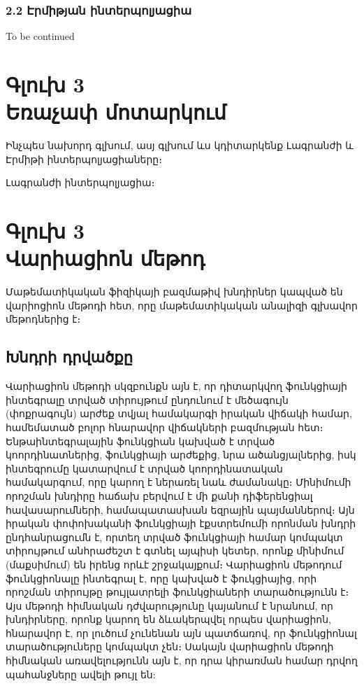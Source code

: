 \documentclass[fleqn, bachelor,subf,12pt,notitlepage]{article}
\begin{document}
\subsubsection*{2.2 Էրմիթյան ինտերպոլյացիա}
To be continued
\newpage


\section*{\centering Գլուխ 3 \\ Եռաչափ մոտարկում}
\setcounter{equation}{0}

Ինչպես նախորդ գլխում, ասյ գլխում ևս կդիտարկենք Լագրանժի և Էրմիթի ինտերպոլյացիաները։


Լագրանժի ինտերպոլյացիա։




\section*{\centering Գլուխ 3 \\ Վարիացիոն մեթոդ}
\setcounter{equation}{0}

Մաթեմատիկական ֆիզիկայի բազմաթիվ խնդիրներ կապված են վարիոցիոն մեթոդի հետ, որը մաթեմատիկական անալիզի գլխավոր մեթոդներից է։

\subsection*{Խնդրի դրվածքը}
\hspace{\parindent}Վարիացիոն մեթոդի սկզբունքն այն է, որ դիտարկվող ֆունկցիայի ինտեգրալը տրված տիրույթում ընդունում է մեծագույն (փոքրագույն) արժեք տվյալ համակարգի իրական վիճակի համար, համեմատած բոլոր հնարավոր վիճակների բազմության հետ։  Ենթաինտեգրալային ֆունկցիան կախված է տրված կոորդինատներից, ֆունկցիայի արժեքից, նրա ածանցյալներից, իսկ ինտեգրումը կատարվում է տրված կոորդինատական համակարգում, որը կարող է ներառել նաև ժամանակը։ Մինիմումի որոշման խնդիրը հաճախ բերվում է մի քանի դիֆերենցիալ հավասարումների, համապատասխան եզրային պայմաններով։  Այն իրական փոփոխականի ֆունկցիայի էքստրեմումի որոնման խնդրի ընդհանրացումն է, որտեղ տրված ֆունկցիայի համար կոմպակտ տիրույթում անհրաժեշտ է գտնել այպիսի կետեր, որոնք մինիմում (մաքսիմում) են իրենց որևէ շրջակայքում։
Վարիացիոն մեթոդում ֆունկցիոնալը ինտեգրալ է, որը կախված է ֆուկցիայից, որի որոշման տիրույթը թույլատրելի ֆունկցիաների  տարածությունն է։
Այս  մեթոդի հիմնական դժվարությունը կայանում է նրանում, որ խնդիրները, որոնք կարող են ձևակերպվել որպես վարիացիոն, հնարավոր է, որ լուծում չունենան այն պատճառով, որ ֆունկցիոնալ տարածություները  կոմպակտ չեն։
Սակայն վարիացիոն մեթոդի հիմնական առավելությունն այն է, որ դրա կիրառման համար դրվող պահանջները ավելի թույլ են:
\newpage
\end{document}
